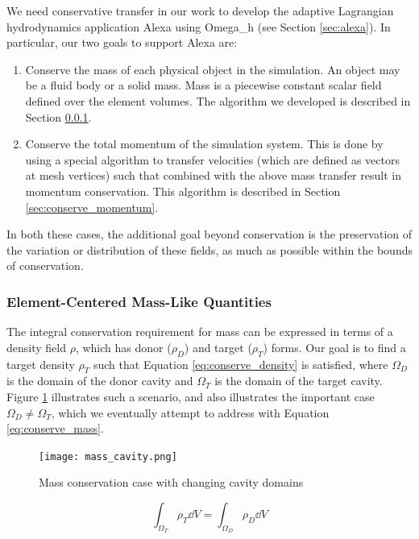 We need conservative transfer in our work to develop the
adaptive Lagrangian hydrodynamics application Alexa
using Omega\_h (see Section \ref{sec:alexa}).
In particular, our two goals to support Alexa are:
\begin{enumerate}
\item Conserve the mass of each physical object in the simulation.
An object may be a fluid body or a solid mass.
Mass is a piecewise constant scalar field defined over the element volumes.
The algorithm we developed is described in Section \ref{sec:conserve_mass}.
\item Conserve the total momentum of the simulation system.
This is done by using a special algorithm to transfer velocities
(which are defined as vectors at mesh vertices) such that combined
with the above mass transfer result in momentum conservation.
This algorithm is described in Section \ref{sec:conserve_momentum}.
\end{enumerate}
In both these cases, the additional goal beyond conservation is
the preservation of the variation or distribution of these fields,
as much as possible within the bounds of conservation.

\subsubsection{Element-Centered Mass-Like Quantities}
\label{sec:conserve_mass}

The integral conservation requirement for mass can be expressed
in terms of a density field $\rho$, which has donor ($\rho_D$)
and target ($\rho_T$) forms.
Our goal is to find a target density $\rho_T$ such that Equation
\ref{eq:conserve_density} is satisfied,
where $\Omega_D$ is the domain of the donor cavity and
$\Omega_T$ is the domain of the target cavity.
Figure \ref{fig:mass_cavity} illustrates such a scenario,
and also illustrates the important case $\Omega_D\neq\Omega_T$,
which we eventually attempt to address with Equation \ref{eq:conserve_mass}.

\begin{figure}
\begin{center}
\texttt{[image: mass\_cavity.png]}
\caption{Mass conservation case with changing cavity domains}
\label{fig:mass_cavity}
\end{center}
\end{figure}

\begin{equation} \label{eq:conserve_density}
\int_{\Omega_T} \rho_T \dd V = \int_{\Omega_D} \rho_D \dd V
\end{equation}

